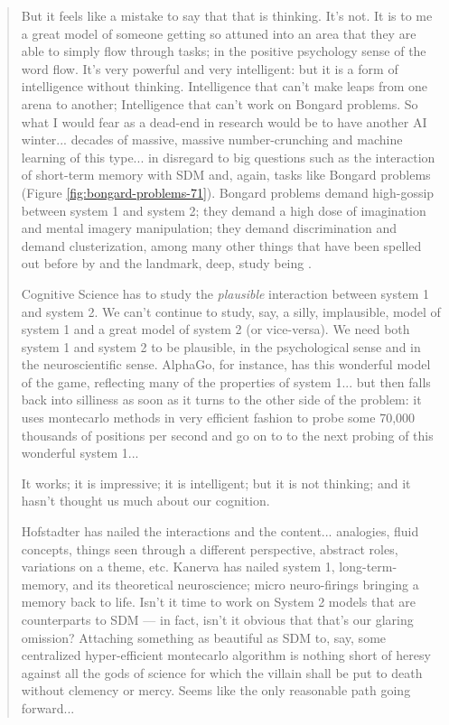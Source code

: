 \begin{quote}
    But it feels like a mistake to say that that is thinking.  It's not.  It is to me a great model of someone getting so attuned into an area that they are able to simply flow through tasks; in the positive psychology sense of the word flow.  It's very powerful and very intelligent:  but it is a form of intelligence without thinking.  Intelligence that can't make leaps from one arena to another; Intelligence that can't work on Bongard problems.  So what I would fear as a dead-end in research would be to have another AI winter... decades of massive, massive number-crunching and machine learning of this type... in disregard to big questions such as the interaction of short-term memory with SDM and, again, tasks like Bongard problems (Figure \ref{fig:bongard-problems-71}).  Bongard problems demand high-gossip between system 1 and system 2; they demand a high dose of imagination and mental imagery manipulation; they demand discrimination and demand clusterization, among many other things that have been spelled out before by \citet{bongard_recognition_1968, douglas1980godel, Linhares2000} and the landmark, deep, study being \citet{foundalis_phaeaco:_2006}.

    Cognitive Science has to study the \emph{plausible} interaction between system 1 and system 2.  We can't continue to study, say, a silly, implausible, model of system 1 and a great model of system 2 (or vice-versa). We need both system 1 and system 2 to be plausible, in the psychological sense and in the neuroscientific sense.  AlphaGo, for instance, has this wonderful model of the game, reflecting many of the properties of system 1... but then falls back into silliness as soon as it turns to the other side of the problem:  it uses montecarlo methods in very efficient fashion to probe some 70,000 thousands of positions per second and go on to to the next probing of this wonderful system 1...

    It works; it is impressive; it is intelligent; but it is not thinking; and it hasn't thought us much about our cognition.

    Hofstadter has nailed the interactions and the content... analogies, fluid concepts, things seen through a different perspective, abstract roles, variations on a theme, etc.  Kanerva has nailed system 1, long-term-memory, and its  theoretical neuroscience; micro neuro-firings bringing a memory back to life.  Isn't it time to work on System 2 models that are counterparts to SDM --- in fact, isn't it obvious that that's our glaring omission?  Attaching something as beautiful as SDM to, say, some centralized hyper-efficient montecarlo algorithm is nothing short of heresy against all the gods of science for which the villain shall be put to death without clemency or mercy. Seems like the only reasonable path going forward...

\end{quote}



